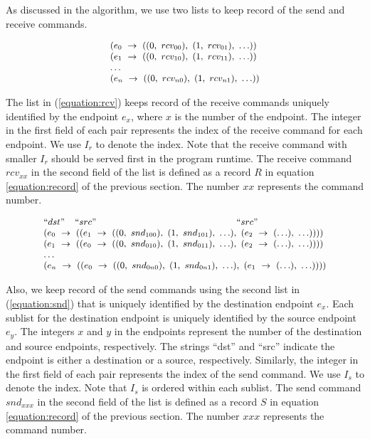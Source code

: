 As discussed in the algorithm, we use two lists to keep record of the send and receive commands.

\begin{equation}
\footnotesize \begin{array}{l}
(e_0\ \rightarrow\ ((0,\ rcv_{00}),\ (1,\ rcv_{01}),\ \ldots))\\
(e_1\ \rightarrow\ ((0,\ rcv_{10}),\ (1,\ rcv_{11}),\ \ldots))\\
\ldots \\
(e_n\ \rightarrow\ ((0,\ rcv_{n0}),\ (1,\ rcv_{n1}),\ \ldots))\\
\end{array}
\label{equation:rcv}
\end{equation}

The list in (\ref{equation:rcv}) keeps record of the receive commands uniquely identified by the endpoint $\mathit{e}_x$, where $x$ is the number of the endpoint. The integer in the first field of each pair represents the index of the receive command for each endpoint. We use $I_r$ to denote the index. Note that the receive command with smaller $I_r$ should be served first in the program runtime. The receive command $rcv_{xx}$ in the second field of the list is defined as a record $R$ in equation \ref{equation:record} of the previous section. The number $xx$ represents the command number.

\begin{equation}
\footnotesize \begin{array}{l}
 ``dst" \;\;\;\; ``src" \;\;\;\;\;\;\;\;\;\;\;\;\;\;\;\;\;\;\;\;\;\;\;\;\;\;\;\;\;\;\;\;\;\;\;\;\;\;\;\;\;\;\;\;\;\;\;\;\;\;\;\;\;\;\; ``src"\\
(e_0\ \rightarrow\ ((e_1\ \rightarrow\ ((0,\ snd_{100}),\ (1,\ snd_{101}),\ \ldots),\ (e_2\ \rightarrow\ (\ldots),\ \ldots))))\\
(e_1\ \rightarrow\ ((e_0\ \rightarrow\ ((0,\ snd_{010}),\ (1,\ snd_{011}),\ \ldots),\ (e_2\ \rightarrow\ (\ldots),\ \ldots))))\\
 \dots\\
(e_n\ \rightarrow\ ((e_0\ \rightarrow\ ((0,\ snd_{0n0}),\ (1,\ snd_{0n1}),\ \ldots),\ (e_1\ \rightarrow\ (\ldots),\ \ldots))))\\
\end{array}
\label{equation:snd}
\end{equation}

Also, we keep record of the send commands using the second list in (\ref{equation:snd}) that is uniquely identified by the destination endpoint $\mathit{e}_x$. Each sublist for the destination endpoint is uniquely identified by the source endpoint $\mathit{e}_y$. The integers $x$ and $y$ in the endpoints represent the number of the destination and source endpoints, respectively. The strings ``dst'' and ``src'' indicate the endpoint is either a destination or a source, respectively. Similarly, the integer in the first field of each pair represents the index of the send command. We use $I_s$ to denote the index. Note that $I_s$ is ordered within each sublist. The send command $snd_{xxx}$ in the second field of the list is defined as a record $S$ in equation \ref{equation:record} of the previous section. The number $xxx$ represents the command number.

